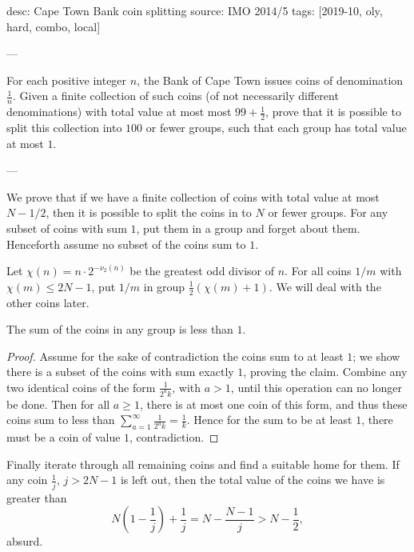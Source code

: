 desc: Cape Town Bank coin splitting
source: IMO 2014/5
tags: [2019-10, oly, hard, combo, local]

---

For each positive integer $n$, the Bank of Cape Town issues coins of denomination $\frac1n$. Given a finite collection of such coins (of not necessarily different denominations) with total value at most most $99+\frac12$, prove that it is possible to split this collection into $100$ or fewer groups, such that each group has total value at most $1$.

---

We prove that if we have a finite collection of coins with total value at most $N-1/2$, then it is possible to split the coins in to $N$ or fewer groups. For any subset of coins with sum $1$, put them in a group and forget about them. Henceforth assume no subset of the coins sum to $1$.

Let $\chi(n)=n\cdot 2^{-\nu_2(n)}$ be the greatest odd divisor of $n$. For all coins $1/m$ with $\chi(m)\le 2N-1$, put $1/m$ in group $\tfrac12(\chi(m)+1)$. We will deal with the other coins later.
\begin{claim*}
    The sum of the coins in any group is less than $1$.
\end{claim*}
\begin{proof}
    Assume for the sake of contradiction the coins sum to at least $1$; we show there is a subset of the coins with sum exactly $1$, proving the claim. Combine any two identical coins of the form $\tfrac1{2^ak}$, with $a>1$, until this operation can no longer be done. Then for all $a\ge 1$, there is at most one coin of this form, and thus these coins sum to less than $\sum_{a=1}^\infty\frac1{2^ak}=\frac1k$. Hence for the sum to be at least $1$, there must be a coin of value $1$, contradiction.
\end{proof}

Finally iterate through all remaining coins and find a suitable home for them. If any coin $\tfrac1j$, $j>2N-1$ is left out, then the total value of the coins we have is greater than \[N\left(1-\frac1j\right)+\frac1j=N-\frac{N-1}j>N-\frac12,\]
absurd.
